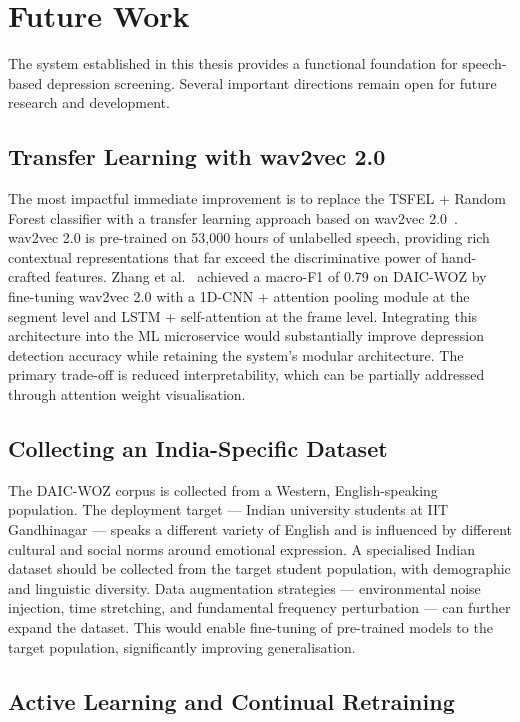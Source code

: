 \chapter{Future Work}
\label{Chapter7}

The system established in this thesis provides a functional foundation for speech-based depression screening. Several important directions remain open for future research and development.

\section{Transfer Learning with wav2vec 2.0}

The most impactful immediate improvement is to replace the TSFEL + Random Forest classifier with a transfer learning approach based on wav2vec 2.0~\cite{Baevski2020, Zhang2023}. wav2vec 2.0 is pre-trained on 53,000 hours of unlabelled speech, providing rich contextual representations that far exceed the discriminative power of hand-crafted features. Zhang et al.~\cite{Zhang2023} achieved a macro-F1 of 0.79 on DAIC-WOZ by fine-tuning wav2vec 2.0 with a 1D-CNN + attention pooling module at the segment level and LSTM + self-attention at the frame level. Integrating this architecture into the ML microservice would substantially improve depression detection accuracy while retaining the system's modular architecture. The primary trade-off is reduced interpretability, which can be partially addressed through attention weight visualisation.

\section{Collecting an India-Specific Dataset}

The DAIC-WOZ corpus is collected from a Western, English-speaking population. The deployment target — Indian university students at IIT Gandhinagar — speaks a different variety of English and is influenced by different cultural and social norms around emotional expression. A specialised Indian dataset should be collected from the target student population, with demographic and linguistic diversity. Data augmentation strategies — environmental noise injection, time stretching, and fundamental frequency perturbation — can further expand the dataset. This would enable fine-tuning of pre-trained models to the target population, significantly improving generalisation.

\section{Active Learning and Continual Retraining}

